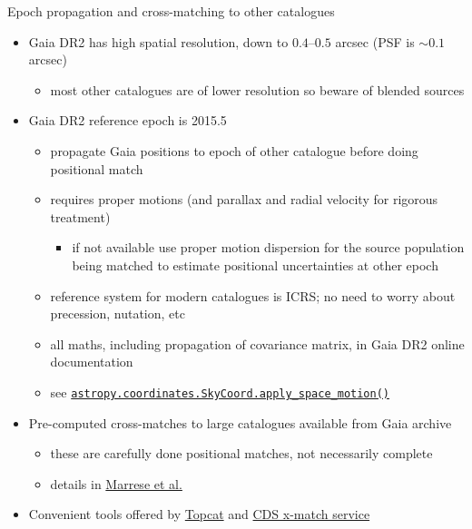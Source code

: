 \documentclass[smaller, aspectratio=169]{beamer}
\begin{document}
%
%
\begin{agaframe}{Epoch propagation and cross-matching to other catalogues}
  \begin{itemize}
    \item Gaia DR2 has high spatial resolution, down to $0.4$--$0.5$ arcsec (PSF is $\sim0.1$
      arcsec)
      \begin{itemize}
        \item most other catalogues are of lower resolution so beware of blended sources
      \end{itemize}
    \item Gaia DR2 reference epoch is 2015.5
      \begin{itemize}
        \item propagate Gaia positions to epoch of other catalogue before doing positional match
        \item requires proper motions (and parallax and radial velocity for rigorous treatment)
          \begin{itemize}
            \item if not available use proper motion dispersion for the source population being
              matched to estimate positional uncertainties at other epoch
          \end{itemize}
        \item reference system for modern catalogues is ICRS; no need to worry about precession,
          nutation, etc
        \item all maths, including propagation of covariance matrix, in Gaia DR2 online documentation
        \item see
          \href{http://docs.astropy.org/en/stable/api/astropy.coordinates.SkyCoord.html}{\texttt{astropy.coordinates.SkyCoord.apply\_space\_motion()}}
      \end{itemize}
    \item Pre-computed cross-matches to large catalogues available from Gaia archive
      \begin{itemize}
        \item these are carefully done positional matches, not necessarily complete
        \item details in \href{https://doi.org/10.1051/0004-6361/201834142}{Marrese et al.}
      \end{itemize}
    \item Convenient tools offered by \href{http://www.star.bris.ac.uk/~mbt/topcat/}{Topcat} and \href{http://cdsxmatch.u-strasbg.fr/}{CDS x-match service}
  \end{itemize}
\end{agaframe}
%
\end{document}
